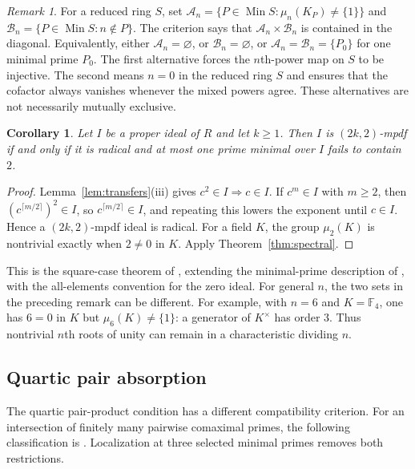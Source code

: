 \documentclass[11pt,a4paper]{amsart}
\newtheorem{corollary}[theorem]{Corollary}
\theoremstyle{definition}
\theoremstyle{remark}
\newtheorem{remark}[theorem]{Remark}
\DeclareMathOperator{\Min}{Min}
\numberwithin{equation}{section}
\begin{document}
\begin{remark}
For a reduced ring $S$, set
$\mathcal A_n=\{P\in\Min S:\mu_n(K_P)\ne\{1\}\}$ and
$\mathcal B_n=\{P\in\Min S:n\notin P\}$. The criterion says that
$\mathcal A_n\times\mathcal B_n$ is contained in the diagonal.
Equivalently, either $\mathcal A_n=\varnothing$, or
$\mathcal B_n=\varnothing$, or
$\mathcal A_n=\mathcal B_n=\{P_0\}$ for one minimal prime $P_0$.
The first alternative forces the $n$th-power map on $S$ to be
injective.  The second means $n=0$ in the reduced ring $S$ and ensures
that the cofactor always vanishes whenever the mixed powers agree.
These alternatives are not necessarily mutually exclusive.
\end{remark}


\begin{corollary}\label{cor:square-recovery}
Let $I$ be a proper ideal of $R$ and let $k\ge1$. Then $I$ is
$(2k,2)$-mpdf if and only if it is radical and at most one prime minimal
over $I$ fails to contain $2$.
\end{corollary}
\begin{proof}
Lemma~\ref{lem:transfers}(iii) gives $c^2\in I\Rightarrow c\in I$.
If $c^m\in I$ with $m\ge2$, then $(c^{\lceil m/2\rceil})^2\in I$, so $c^{\lceil m/2\rceil}\in I$,
and repeating this lowers the exponent until $c\in I$. Hence a $(2k,2)$-mpdf ideal is radical.
For a field $K$, the group $\mu_2(K)$ is nontrivial exactly when
$2\ne0$ in $K$. Apply Theorem~\ref{thm:spectral}.
\end{proof}

This is the square-case theorem of \cite{TS}, extending the
minimal-prime description of \cite{Hizem}, with the all-elements convention for the zero ideal.
For general $n$, the two sets in the preceding remark can be different.
For example, with $n=6$ and $K=\mathbb F_4$, one has $6=0$ in $K$
but $\mu_6(K)\ne\{1\}$: a generator of $K^\times$ has order $3$.
Thus nontrivial $n$th roots of unity can remain in a characteristic
dividing $n$.

\subsection{Quartic pair absorption}
\label{quartic:spectral-section}

The quartic pair-product condition has a different compatibility
criterion. For an intersection of finitely many pairwise comaximal
primes, the following classification is
\cite[Theorem~2.8]{TAHA}. Localization at three selected minimal
primes removes both restrictions.
\end{document}
